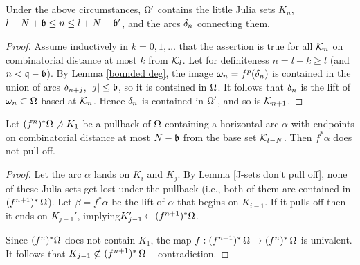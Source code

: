 \begin{lem}\label{J-sets don't pull off}
Under the above circumstances, ${\Omega}'$ contains the little Julia sets $K_n$,
 $   l- N + {\mathfrak{b}} \leq n\leq l+ N-{\mathfrak{b}}'$, and the arcs ${\delta}_n$ connecting
 them.  
\end{lem}

\begin{proof}
Assume inductively in $k=0,1,\dots$ that the assertion is true for all
${\mathcal K}_n$ on combinatorial distance at most  $k$ from ${\mathcal K}_l$.
Let for definiteness $n=l+k \geq l$ (and $n<{\mathfrak{q}}- {\mathfrak{b}}$). 
By Lemma \ref{bounded deg},  the  image ${\omega}_n= f^p({\delta}_n) $ is contained in the
union of arcs ${\delta}_{n+j}$, $  |j|\leq {\mathfrak{b}}$, so it is contsined in
  ${\Omega}$.  It follows that ${\delta}_n$ is the lift of ${\omega}_n\subset {\Omega}$
  based at ${\mathcal K}_n$. Hence ${\delta}_n$ is contained in ${\Omega}'$, and so is ${\mathcal K}_{n+1}$.  
\end{proof}



\begin{lem}\label{interesting moments}
 Let $(f^n)^* {\Omega}\not\supset K_1$  %
 be a pullback  of ${\Omega}$
 containing a horizontal arc $\alpha$
 with endpoints on combinatorial distance at
most $N-{\mathfrak{b}}$ from  the base set ${\mathcal K}_{l-N}$.
Then   $f^* \alpha$  does not pull off.
\end{lem}
 
\begin{proof}
Let the arc $\alpha$ lands on $K_i$ and $K_j$. By Lemma \ref{J-sets
  don't pull off}, none of these  Julia sets get lost under the pullback
(i.e.,  both of them are contained in $(f^{n+1})^*\, {\Omega}$).
Let $\beta= f^* \alpha$ be the lift of $\alpha$ that begins on $K_{i-1}$. 
If it pulls off then  it ends on $K_{j-1}'$,
implying$K_{j-1}'\subset ( f^{n+1})^*  {\Omega}$. 

Since  $( f^n)^* {\Omega} $ does not contain $K_1$, 
the map $f: ( f^{n+1})^*\, {\Omega} \rightarrow ( f^n)^*\,  {\Omega} $ is univalent. 
It follows that $K_{j-1}\not\subset ( f^{n+1})^*\,  {\Omega} $ -- contradiction. 
\end{proof}
